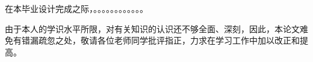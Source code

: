 \chapter{\acknowledgementtitle}

在本毕业设计完成之际，。。。。。。。。。。。。
 
由于本人的学识水平所限，对有关知识的认识还不够全面、深刻，因此，本论文难免有错漏疏忽之处，敬请各位老师同学批评指正，力求在学习工作中加以改正和提高。
